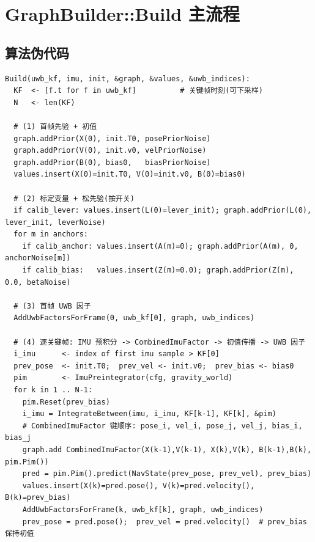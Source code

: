 \documentclass[11pt,a4paper]{report}
\begin{document}
\section{GraphBuilder::Build 主流程}
\subsection{算法伪代码}
\begin{lstlisting}[style=cpp]
Build(uwb_kf, imu, init, &graph, &values, &uwb_indices):
  KF  <- [f.t for f in uwb_kf]          # 关键帧时刻(可下采样)
  N   <- len(KF)

  # (1) 首帧先验 + 初值
  graph.addPrior(X(0), init.T0, posePriorNoise)
  graph.addPrior(V(0), init.v0, velPriorNoise)
  graph.addPrior(B(0), bias0,   biasPriorNoise)
  values.insert(X(0)=init.T0, V(0)=init.v0, B(0)=bias0)

  # (2) 标定变量 + 松先验(按开关)
  if calib_lever: values.insert(L(0)=lever_init); graph.addPrior(L(0), lever_init, leverNoise)
  for m in anchors:
    if calib_anchor: values.insert(A(m)=0); graph.addPrior(A(m), 0, anchorNoise[m])
    if calib_bias:   values.insert(Z(m)=0.0); graph.addPrior(Z(m), 0.0, betaNoise)

  # (3) 首帧 UWB 因子
  AddUwbFactorsForFrame(0, uwb_kf[0], graph, uwb_indices)

  # (4) 逐关键帧: IMU 预积分 -> CombinedImuFactor -> 初值传播 -> UWB 因子
  i_imu      <- index of first imu sample > KF[0]
  prev_pose  <- init.T0;  prev_vel <- init.v0;  prev_bias <- bias0
  pim        <- ImuPreintegrator(cfg, gravity_world)
  for k in 1 .. N-1:
    pim.Reset(prev_bias)
    i_imu = IntegrateBetween(imu, i_imu, KF[k-1], KF[k], &pim)
    # CombinedImuFactor 键顺序: pose_i, vel_i, pose_j, vel_j, bias_i, bias_j
    graph.add CombinedImuFactor(X(k-1),V(k-1), X(k),V(k), B(k-1),B(k), pim.Pim())
    pred = pim.Pim().predict(NavState(prev_pose, prev_vel), prev_bias)
    values.insert(X(k)=pred.pose(), V(k)=pred.velocity(), B(k)=prev_bias)
    AddUwbFactorsForFrame(k, uwb_kf[k], graph, uwb_indices)
    prev_pose = pred.pose();  prev_vel = pred.velocity()  # prev_bias 保持初值
\end{lstlisting}
\end{document}
